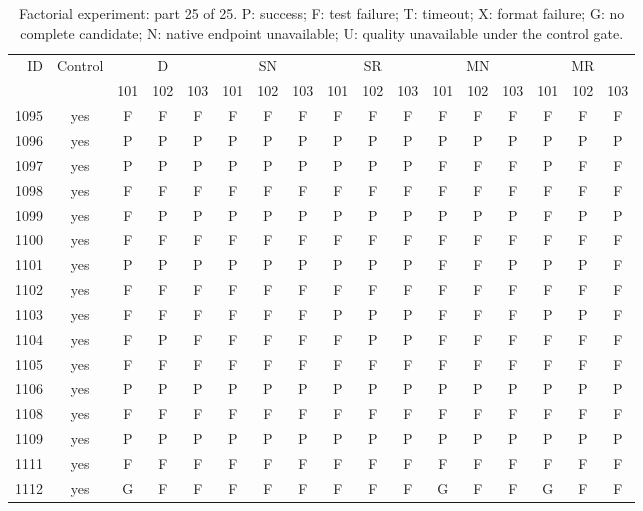 \begin{table}[p]\centering\footnotesize
\setlength{\tabcolsep}{3pt}
\caption{Factorial experiment: part 25 of 25. P: success; F: test failure; T: timeout; X: format failure; G: no complete candidate; N: native endpoint unavailable; U: quality unavailable under the control gate.}
\begin{tabular*}{\textwidth}{@{\extracolsep{\fill}}rcccccccccccccccc}\toprule
ID & Control & \multicolumn{3}{c}{D} & \multicolumn{3}{c}{SN} & \multicolumn{3}{c}{SR} & \multicolumn{3}{c}{MN} & \multicolumn{3}{c}{MR}\\
\cmidrule(lr){3-5}\cmidrule(lr){6-8}\cmidrule(lr){9-11}\cmidrule(lr){12-14}\cmidrule(lr){15-17}
 & & 101 & 102 & 103 & 101 & 102 & 103 & 101 & 102 & 103 & 101 & 102 & 103 & 101 & 102 & 103\\\midrule
1095 & yes & F & F & F & F & F & F & F & F & F & F & F & F & F & F & F\\
1096 & yes & P & P & P & P & P & P & P & P & P & P & P & P & P & P & P\\
1097 & yes & P & P & P & P & P & P & P & P & P & F & F & F & P & F & F\\
1098 & yes & F & F & F & F & F & F & F & F & F & F & F & F & F & F & F\\
1099 & yes & F & P & P & P & P & P & P & P & P & P & P & P & F & P & P\\
1100 & yes & F & F & F & F & F & F & F & F & F & F & F & F & F & F & F\\
1101 & yes & P & P & P & P & P & P & P & P & P & F & F & P & P & P & F\\
1102 & yes & F & F & F & F & F & F & F & F & F & F & F & F & F & F & F\\
1103 & yes & F & F & F & F & F & F & P & P & P & F & F & F & P & P & F\\
1104 & yes & F & P & F & F & F & F & F & P & P & F & F & F & F & F & F\\
1105 & yes & F & F & F & F & F & F & F & F & F & F & F & F & F & F & F\\
1106 & yes & P & P & P & P & P & P & P & P & P & P & P & P & P & P & P\\
1108 & yes & F & F & F & F & F & F & F & F & F & F & F & F & F & F & F\\
1109 & yes & P & P & P & P & P & P & P & P & P & P & P & P & P & P & P\\
1111 & yes & F & F & F & F & F & F & F & F & F & F & F & F & F & F & F\\
1112 & yes & G & F & F & F & F & F & F & F & F & G & F & F & G & F & F\\

\end{tabular*}
\end{table}
